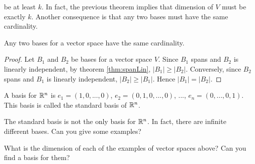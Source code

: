 be at least $k$. In fact, the previous theorem implies that dimension
of $V$ must be exactly $k$. Another consequence is that any two bases must have
the same cardinality. 
\begin{corollary}
  Any two bases for a vector space have the same cardinality.
\end{corollary}
\begin{proof}
  Let $B_1$ and $B_2$ be bases for a vector space $V$. Since $B_1$
  spans and $B_2$ is linearly independent, by theorem
  \ref{thm:spanLin}, $|B_1| \geq |B_2|$. Conversely, since $B_2$ spans
  and $B_1$ is linearly independent, $|B_2| \geq |B_1|$. Hence $|B_1|
  = |B_2|$.
\end{proof}
\begin{example}
  A basis for $\mathbb{R}^n$ is $e_1 = (1, 0, ..., 0 )$, $e_2 = (0, 1, 0, ...,
  0)$, $...$, $e_n = (0, ... , 0 , 1)$. This basis is called the
  standard basis of $\mathbb{R}^n$. 

  The standard basis is not the only basis for $\mathbb{R}^n$. In fact, there
  are infinite different bases. Can you give some examples?
\end{example}
\begin{exercise} 
  What is the dimension of each of the examples of vector spaces
  above? Can you find a basis for them? 
\end{exercise}

